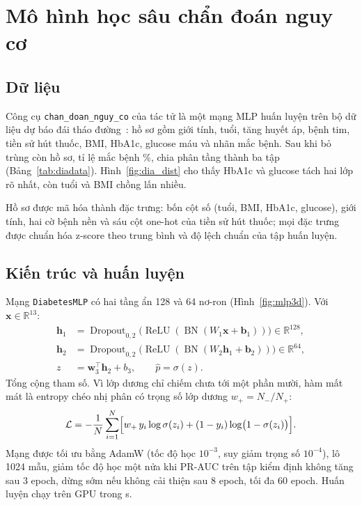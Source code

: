 
\section{Mô hình học sâu chẩn đoán nguy cơ}
\subsection{Dữ liệu}
Công cụ \texttt{chan\_doan\_nguy\_co} của tác tử là một mạng MLP huấn luyện trên bộ dữ liệu dự báo đái tháo
đường~\cite{mustafa2023diabetes}: hồ sơ gồm giới tính, tuổi, tăng huyết áp, bệnh tim, tiền sử hút thuốc, BMI, HbA1c,
glucose máu và nhãn mắc bệnh. Sau khi bỏ trùng còn  hồ sơ, tỉ lệ mắc bệnh
\%, chia phân tầng thành ba tập (Bảng~\ref{tab:diadata}). Hình~\ref{fig:dia_dist}
cho thấy HbA1c và glucose tách hai lớp rõ nhất, còn tuổi và BMI chồng lấn nhiều.


Hồ sơ được mã hóa thành  đặc trưng: bốn cột số (tuổi, BMI, HbA1c, glucose), giới
tính, hai cờ bệnh nền và sáu cột one-hot của tiền sử hút thuốc; mọi đặc trưng được chuẩn hóa z-score theo trung
bình và độ lệch chuẩn của tập huấn luyện.


\subsection{Kiến trúc và huấn luyện}
Mạng \texttt{DiabetesMLP} có hai tầng ẩn 128 và 64 nơ-ron (Hình~\ref{fig:mlp3d}). Với $\mathbf{x} \in
\mathbb{R}^{13}$:
\begin{align}
  \mathbf{h}_1 &= \operatorname{Dropout}_{0{,}2}\bigl(\operatorname{ReLU}(\operatorname{BN}(W_1\mathbf{x} + \mathbf{b}_1))\bigr) \in \mathbb{R}^{128},\\
  \mathbf{h}_2 &= \operatorname{Dropout}_{0{,}2}\bigl(\operatorname{ReLU}(\operatorname{BN}(W_2\mathbf{h}_1 + \mathbf{b}_2))\bigr) \in \mathbb{R}^{64},\\
  z &= \mathbf{w}_3^\top \mathbf{h}_2 + b_3, \qquad \hat{p} = \sigma(z).
\end{align}
Tổng cộng  tham số. Vì lớp dương chỉ chiếm chưa tới một phần mười, hàm mất mát là
entropy chéo nhị phân có trọng số lớp dương $w_+ = N_-/N_+$:
\begin{equation}
  \mathcal{L} = -\frac{1}{N}\sum_{i=1}^{N}\Bigl[w_+\, y_i \log \sigma(z_i) + (1-y_i)\log\bigl(1-\sigma(z_i)\bigr)\Bigr].
\end{equation}
Mạng được tối ưu bằng AdamW (tốc độ học $10^{-3}$, suy giảm trọng số $10^{-4}$), lô 1024 mẫu, giảm tốc độ học một
nửa khi PR-AUC trên tập kiểm định không tăng sau 3 epoch, dừng sớm nếu không cải thiện sau 8 epoch, tối đa 60
epoch. Huấn luyện chạy trên GPU trong  s.

